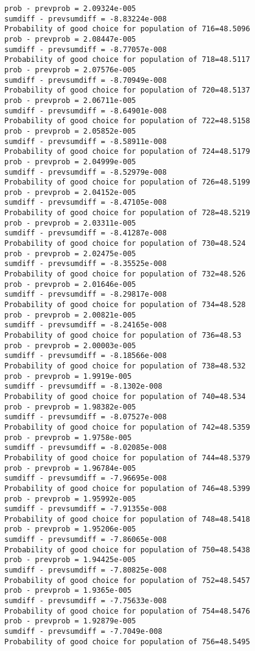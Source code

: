 \documentclass[11pt,onecolumn]{article}
\begin{document}
\begin{verbatim}
prob - prevprob = 2.09324e-005
sumdiff - prevsumdiff = -8.83224e-008
Probability of good choice for population of 716=48.5096
prob - prevprob = 2.08447e-005
sumdiff - prevsumdiff = -8.77057e-008
Probability of good choice for population of 718=48.5117
prob - prevprob = 2.07576e-005
sumdiff - prevsumdiff = -8.70949e-008
Probability of good choice for population of 720=48.5137
prob - prevprob = 2.06711e-005
sumdiff - prevsumdiff = -8.64901e-008
Probability of good choice for population of 722=48.5158
prob - prevprob = 2.05852e-005
sumdiff - prevsumdiff = -8.58911e-008
Probability of good choice for population of 724=48.5179
prob - prevprob = 2.04999e-005
sumdiff - prevsumdiff = -8.52979e-008
Probability of good choice for population of 726=48.5199
prob - prevprob = 2.04152e-005
sumdiff - prevsumdiff = -8.47105e-008
Probability of good choice for population of 728=48.5219
prob - prevprob = 2.03311e-005
sumdiff - prevsumdiff = -8.41287e-008
Probability of good choice for population of 730=48.524
prob - prevprob = 2.02475e-005
sumdiff - prevsumdiff = -8.35525e-008
Probability of good choice for population of 732=48.526
prob - prevprob = 2.01646e-005
sumdiff - prevsumdiff = -8.29817e-008
Probability of good choice for population of 734=48.528
prob - prevprob = 2.00821e-005
sumdiff - prevsumdiff = -8.24165e-008
Probability of good choice for population of 736=48.53
prob - prevprob = 2.00003e-005
sumdiff - prevsumdiff = -8.18566e-008
Probability of good choice for population of 738=48.532
prob - prevprob = 1.9919e-005
sumdiff - prevsumdiff = -8.1302e-008
Probability of good choice for population of 740=48.534
prob - prevprob = 1.98382e-005
sumdiff - prevsumdiff = -8.07527e-008
Probability of good choice for population of 742=48.5359
prob - prevprob = 1.9758e-005
sumdiff - prevsumdiff = -8.02085e-008
Probability of good choice for population of 744=48.5379
prob - prevprob = 1.96784e-005
sumdiff - prevsumdiff = -7.96695e-008
Probability of good choice for population of 746=48.5399
prob - prevprob = 1.95992e-005
sumdiff - prevsumdiff = -7.91355e-008
Probability of good choice for population of 748=48.5418
prob - prevprob = 1.95206e-005
sumdiff - prevsumdiff = -7.86065e-008
Probability of good choice for population of 750=48.5438
prob - prevprob = 1.94425e-005
sumdiff - prevsumdiff = -7.80825e-008
Probability of good choice for population of 752=48.5457
prob - prevprob = 1.9365e-005
sumdiff - prevsumdiff = -7.75633e-008
Probability of good choice for population of 754=48.5476
prob - prevprob = 1.92879e-005
sumdiff - prevsumdiff = -7.7049e-008
Probability of good choice for population of 756=48.5495

\end{verbatim}
\end{document}
